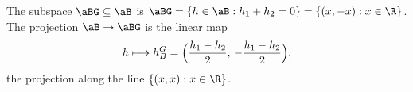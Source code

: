The subspace $\aBG\subseteq\aB$ is $\aBG=\{h\in\aB:h_1+h_2=0\}=\{(x,-x):x\in\R\}$. The projection
$\aB\to\aBG$ is the linear map
\[
  h\longmapsto h_B^G=\Bigl(\frac{h_1-h_2}2,\,-\frac{h_1-h_2}2\Bigr),
\]
the projection along the line $\{(x,x):x\in\R\}$.
